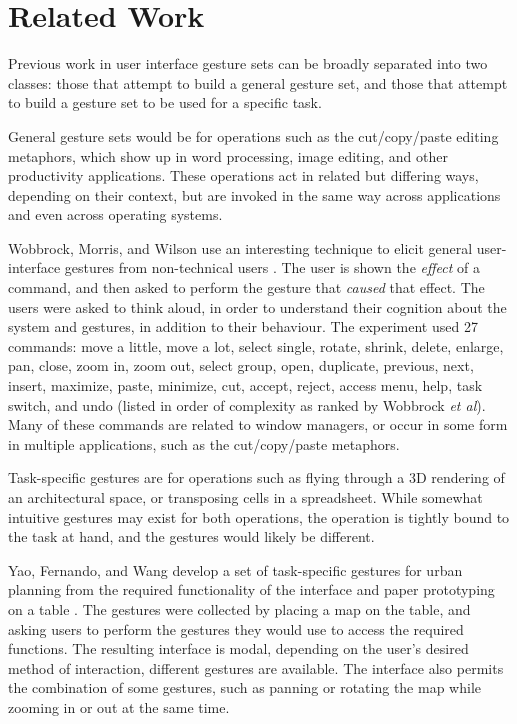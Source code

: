 \chapter{Related Work}

Previous work in user interface gesture sets can be broadly separated into two classes: those that attempt to build a general gesture set, and those that attempt to build a gesture set to be used for a specific task. 

General gesture sets would be for operations such as the cut/copy/paste editing metaphors, which show up in word processing, image editing, and other productivity applications. 
These operations act in related but differing ways, depending on their context, but are invoked in the same way across applications and even across operating systems. 

Wobbrock, Morris, and Wilson use an interesting technique to elicit general user-interface gestures from non-technical users \citep{wobbrock2009user}.
The user is shown the \textit{effect} of a command, and then asked to perform the gesture that \textit{caused} that effect. 
The users were asked to think aloud, in order to understand their cognition about the system and gestures, in addition to their behaviour. 
The experiment used 27 commands: move a little, move a lot, select single, rotate, shrink, delete, enlarge, pan, close, zoom in, zoom out, select group, open, duplicate, previous, next, insert, maximize, paste, minimize, cut, accept, reject, access menu, help, task switch, and undo (listed in order of complexity as ranked by Wobbrock \textit{et al}).
Many of these commands are related to window managers, or occur in some form in multiple applications, such as the cut/copy/paste metaphors.

Task-specific gestures are for operations such as flying through a 3D rendering of an architectural space, or transposing cells in a spreadsheet. 
While somewhat intuitive gestures may exist for both operations, the operation is tightly bound to the task at hand, and the gestures would likely be different. 

Yao, Fernando, and Wang develop a set of task-specific gestures for urban planning from the required functionality of the interface and paper prototyping on a table \citep{yao2012multi}. 
The gestures were collected by placing a map on the table, and asking users to perform the gestures they would use to access the required functions. 
The resulting interface is modal, depending on the user's desired method of interaction, different gestures are available. 
The interface also permits the combination of some gestures, such as panning or rotating the map while zooming in or out at the same time. 

